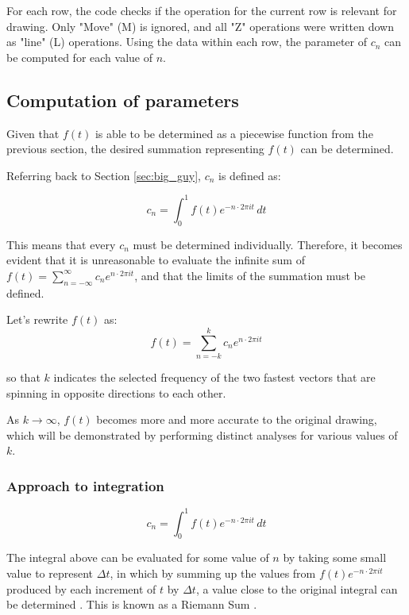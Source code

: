 \documentclass[letterpaper, 12pt]{article}
\begin{document}
For each row, the code checks if the operation for the current
row is relevant for drawing. Only "Move" (M) is ignored, and
all "Z" operations were written down as "line" (L) operations.
Using the data within each row, the parameter of \(c_n\) can be
computed for each value of \(n\).

\subsection{Computation of parameters}

Given that \(f(t)\) is able to be determined as a piecewise function
from the previous section, the desired summation representing
\(f(t)\) can be determined.

Referring back to Section \ref*{sec:big_guy}, \(c_n\) is defined as:

\begin{equation*}
    c_n = \int_{0}^{1} f(t) e^{-n \cdot 2\pi it} \,dt
\end{equation*}

This means that every \(c_n\) must be determined individually. Therefore,
it becomes evident that it is unreasonable to evaluate the infinite sum of
\(f(t) = \sum_{n=-\infty}^{\infty} c_n e^{n \cdot 2\pi it}\), and that
the limits of the summation must be defined.

Let's rewrite \(f(t)\) as:
\begin{equation*}
    f(t) = \sum_{n=-k}^{k} c_n e^{n \cdot 2\pi it}
\end{equation*}

so that \(k\) indicates the selected frequency of the two fastest vectors
that are spinning in opposite directions to each other.

As \(k \to \infty\), \(f(t)\) becomes more and more accurate to
the original drawing, which will be demonstrated by performing distinct
analyses for various values of \(k\).

\subsubsection{Approach to integration} \label{sec:approachInteg}

\begin{equation*}
    c_n = \int_{0}^{1} f(t) e^{-n \cdot 2\pi it} \,dt
\end{equation*}

The integral above can be evaluated for some value of \(n\) by
taking some small value to represent \(\Delta t\), in which
by summing up the values from \(f(t) e^{-n \cdot 2\pi it}\)
produced by each increment of \(t\) by \(\Delta t\), a value close
to the original integral can be determined \cite{sandersonWhatFourierSeries2019}.
This is known as a Riemann Sum \cite{RiemannSum2023}.
\end{document}
